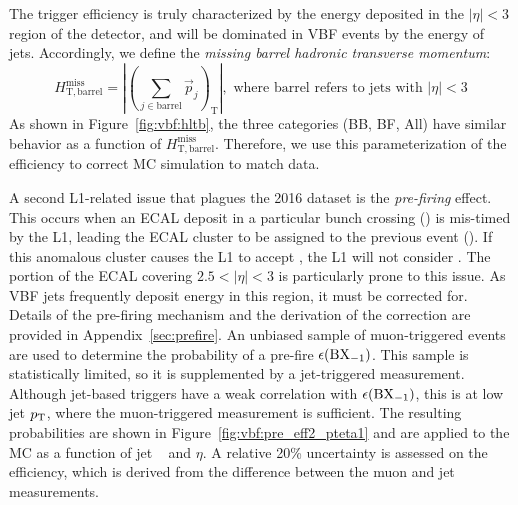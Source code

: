 The trigger efficiency is truly characterized by the energy deposited in the $|\eta|<3$ region of the detector, and will be dominated in VBF events by the energy of jets.
Accordingly, we define the \emph{missing barrel hadronic transverse momentum}:
\begin{equation}
    H_\mathrm{T,barrel}^\mathrm{miss} = \left|\left(\sum_{j\in\text{barrel}} \vec{p}_j \right)_\mathrm{T}\right|, \text{ where barrel refers to jets with $|\eta|<3$}
\end{equation}
As shown in Figure~\ref{fig:vbf:hltb}, the three categories (BB, BF, All) have similar behavior as a function of $H_\mathrm{T,barrel}^\mathrm{miss}$.
Therefore, we use this parameterization of the efficiency to correct MC simulation to match data. 

A second L1-related issue that plagues the 2016 dataset is the \emph{pre-firing} effect.
This occurs when an ECAL deposit in a particular bunch crossing () is mis-timed by the L1, leading the ECAL cluster to be assigned to the previous event ().
If this anomalous cluster causes the L1 to accept , the L1 will not consider .
The portion of the ECAL covering $2.5 < |\eta| < 3$ is particularly prone to this issue.
As VBF jets frequently deposit energy in this region, it must be corrected for. 
Details of the pre-firing mechanism and the derivation of the correction are provided in Appendix~\ref{sec:prefire}.
An unbiased sample of muon-triggered events are used to determine the probability of a pre-fire $\epsilon({\mathrm{BX}_{-1}})$.
This sample is statistically limited, so it is supplemented by a jet-triggered measurement.
Although jet-based triggers have a weak correlation with $\epsilon({\mathrm{BX}_{-1}})$, this is at low jet $p_\mathrm{T}$, where the muon-triggered measurement is sufficient. 
The resulting probabilities are shown in Figure~\ref{fig:vbf:pre_eff2_pteta1} and are applied to the MC as a function of jet \pt~ and $\eta$.
A relative 20\% uncertainty is assessed on the efficiency, which is derived from the difference between the muon and jet measurements. 

